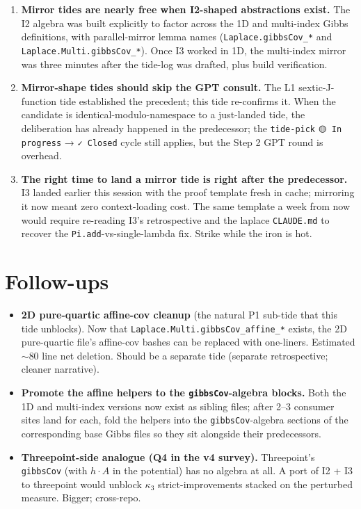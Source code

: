 \documentclass[11pt]{article}
\begin{document}
\begin{enumerate}[leftmargin=*]

\item \textbf{Mirror tides are nearly free when I2-shaped abstractions
exist.} The I2 algebra was built explicitly to factor across the 1D
and multi-index Gibbs definitions, with parallel-mirror lemma names
(\texttt{Laplace.gibbsCov\_*} and \texttt{Laplace.Multi.gibbsCov\_*}).
Once I3 worked in 1D, the multi-index mirror was three minutes after
the tide-log was drafted, plus build verification.

\item \textbf{Mirror-shape tides should skip the GPT consult.} The L1
sextic-J-function tide established the precedent; this tide
re-confirms it. When the candidate is identical-modulo-namespace to a
just-landed tide, the deliberation has already happened in the
predecessor; the \texttt{tide-pick} \texttt{🟡 In progress} → \texttt{✓
Closed} cycle still applies, but the Step 2 GPT round is overhead.

\item \textbf{The right time to land a mirror tide is right after the
predecessor.} I3 landed earlier this session with the proof template
fresh in cache; mirroring it now meant zero context-loading cost. The
same template a week from now would require re-reading I3's
retrospective and the laplace \texttt{CLAUDE.md} to recover the
\texttt{Pi.add}-vs-single-lambda fix. Strike while the iron is hot.

\end{enumerate}

\section{Follow-ups}

\begin{itemize}[leftmargin=*]

\item \textbf{2D pure-quartic affine-cov cleanup} (the natural P1
sub-tide that this tide unblocks). Now that
\texttt{Laplace.Multi.gibbsCov\_affine\_*} exists, the
2D pure-quartic file's affine-cov bashes can be replaced with
one-liners. Estimated $\sim$80 line net deletion. Should be a separate
tide (separate retrospective; cleaner narrative).

\item \textbf{Promote the affine helpers to the
\texttt{gibbsCov}-algebra blocks.} Both the 1D and multi-index
versions now exist as sibling files; after 2--3 consumer sites land
for each, fold the helpers into the
\texttt{gibbsCov}-algebra sections of the corresponding base Gibbs
files so they sit alongside their predecessors.

\item \textbf{Threepoint-side analogue (Q4 in the v4 survey).}
Threepoint's \texttt{gibbsCov} (with $h \cdot A$ in the potential) has
no algebra at all. A port of I2 + I3 to threepoint would unblock
$\kappa_3$ strict-improvements stacked on the perturbed measure.
Bigger; cross-repo.

\end{itemize}
\end{document}
